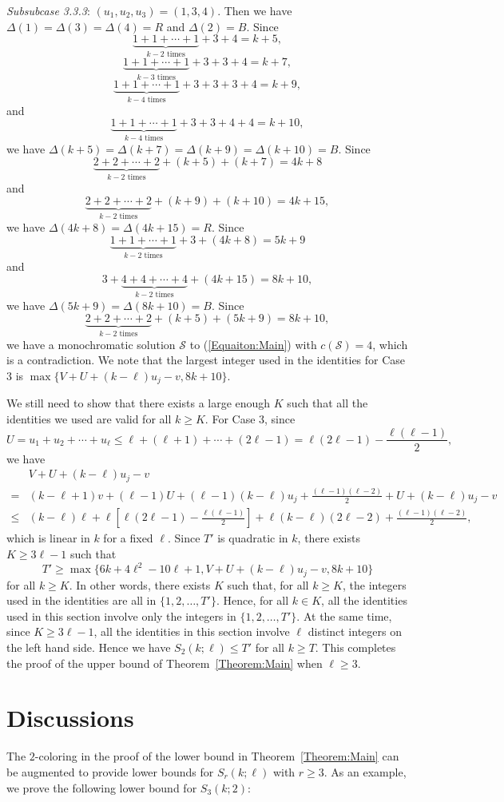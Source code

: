 \documentclass[11pt]{article}
\theoremstyle{definition}
\begin{document}
\textsl{Subsubcase 3.3.3}: $(u_1,u_2,u_3)=(1,3,4)$. Then we have $\Delta(1)=\Delta(3)=\Delta(4)=R$ and $\Delta(2)=B$. Since
\[
\underbrace{1+1+\cdots+1}_{k-2\text{ times}}+3+4=k+5,
\]
\[
\underbrace{1+1+\cdots+1}_{k-3\text{ times}}+3+3+4=k+7,
\]
\[
\underbrace{1+1+\cdots+1}_{k-4\text{ times}}+3+3+3+4=k+9,
\]
and
\[
\underbrace{1+1+\cdots+1}_{k-4\text{ times}}+3+3+4+4=k+10,
\]
we have $\Delta(k+5)=\Delta(k+7)=\Delta(k+9)=\Delta(k+10)=B$. Since
\[
\underbrace{2+2+\cdots+2}_{k-2\text{ times}}+(k+5)+(k+7)=4k+8
\]
and
\[
\underbrace{2+2+\cdots+2}_{k-2\text{ times}}+(k+9)+(k+10)=4k+15,
\]
we have $\Delta(4k+8)=\Delta(4k+15)=R$. Since
\[
\underbrace{1+1+\cdots+1}_{k-2\text{ times}}+3+(4k+8)=5k+9
\]
and
\[
3+\underbrace{4+4+\cdots+4}_{k-2\text{ times}}+(4k+15)=8k+10,
\]
we have $\Delta(5k+9)=\Delta(8k+10)=B$. Since
\[
\underbrace{2+2+\cdots+2}_{k-2\text{ times}}+(k+5)+(5k+9)=8k+10,
\]
we have a monochromatic solution $\mathcal{S}$ to (\ref{Equaiton:Main}) with $c(\mathcal{S})=4$, which is a contradiction. We note that the largest integer used in the identities for Case 3 is $\max\{V+U+(k-\ell)u_j-v,8k+10\}$.

We still need to show that there exists a large enough $K$ such that all the identities we used are valid for all $k\geq K$. For Case 3, since
\[
U=u_1+u_2+\cdots+u_\ell\leq\ell+(\ell+1)+\cdots+(2\ell-1)=\ell(2\ell-1)-\frac{\ell(\ell-1)}{2},
\]
we have
\[
\begin{split}
&V+U+(k-\ell)u_j-v\\=&(k-\ell+1)v+(\ell-1)U+(\ell-1)(k-\ell)u_j+\frac{(\ell-1)(\ell-2)}{2}+U+(k-\ell)u_j-v\\\leq&(k-\ell)\ell+\ell\left[\ell(2\ell-1)-\frac{\ell(\ell-1)}{2}\right]+\ell(k-\ell)(2\ell-2)+\frac{(\ell-1)(\ell-2)}{2},
\end{split}
\]
which is linear in $k$ for a fixed $\ell$. Since $T'$ is quadratic in $k$, there exists $K\geq3\ell-1$ such that
\[
T'\geq\max\{6k+4\ell^2-10\ell+1,V+U+(k-\ell)u_j-v,8k+10\}
\]
for all $k\geq K$. In other words, there exists $K$ such that, for all $k\geq K$, the integers used in the identities are all in $\{1,2,\ldots,T'\}$. Hence, for all $k\in K$, all the identities used in this section involve only the integers in $\{1,2,\ldots,T'\}$. At the same time, since $K\geq3\ell-1$, all the identities in this section involve $\ell$ distinct integers on the left hand side. Hence we have $S_2(k;\ell)\leq T'$ for all $k\geq T$. This completes the proof of the upper bound of Theorem~\ref{Theorem:Main} when $\ell\geq3$.

\section{Discussions}\label{Section:Conluding}
The $2$-coloring in the proof of the lower bound in Theorem~\ref{Theorem:Main} can be augmented to provide lower bounds for $S_r(k;\ell)$ with $r\geq3$. As an example, we prove the following lower bound for $S_3(k;2)$:
\end{document}
